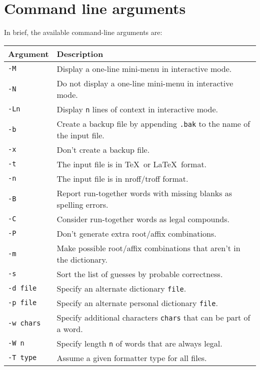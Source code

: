 \section{Command line arguments}

In brief, the available command-line arguments are:

\begin{latexonly}
\begin{tabular}{ll}
Argument & Description \\ \hline
{\tt -M       } & Display a one-line mini-menu in interactive mode.\\
{\tt -N       } & Do not display a one-line mini-menu in interactive mode.\\
{\tt -Ln      } & Display \verb+n+ lines of context in interactive mode.\\

{\tt -b       } & Create a backup file by appending \verb+.bak+ to the name of
                  the input file.\\
{\tt -x       } & Don't create a backup file.\\

{\tt -t       } & The input file is in \TeX\ or \LaTeX\ format.\\
{\tt -n       } & The input file is in nroff/troff format.\\

{\tt -B       } & Report run-together words with missing blanks as spelling
                  errors.\\
{\tt -C       } & Consider run-together words as legal compounds.\\

{\tt -P       } & Don't generate extra root/affix combinations.\\
{\tt -m       } & Make possible root/affix combinations that aren't in the
                  dictionary.\\

{\tt -s       } & Sort the list of guesses by probable correctness.\\
{\tt -d file  } & Specify an alternate dictionary \verb+file+\@.\\
{\tt -p file  } & Specify an alternate personal dictionary \verb+file+\@.\\
{\tt -w chars } & Specify additional characters \verb+chars+ that can be part
                  of a word.\\
{\tt -W n     } & Specify length \verb+n+ of words that are always legal.\\
{\tt -T type  } & Assume a given formatter type for all files.\\


\end{tabular}
\end{latexonly}
